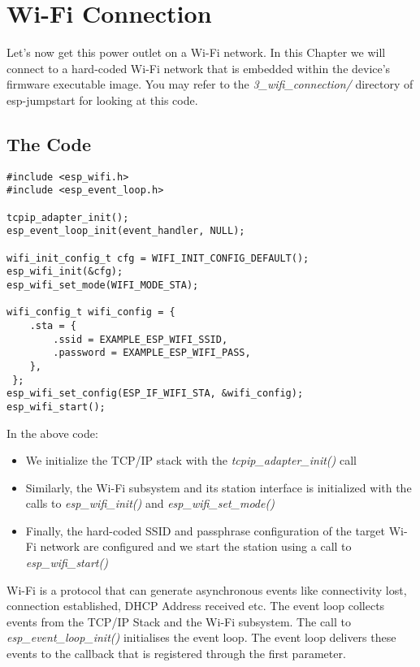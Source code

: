 \documentclass[main.tex]{subfiles}
\begin{document}
\chapter{Wi-Fi Connection}

Let's now get this power outlet on a Wi-Fi network. In this Chapter we will connect to a hard-coded Wi-Fi network that is embedded within the device's firmware executable image. You may refer to the \textit{3\_wifi\_connection/} directory of esp-jumpstart for looking at this code.

\section{The Code}
\begin{verbatim}
#include <esp_wifi.h>
#include <esp_event_loop.h>

tcpip_adapter_init();
esp_event_loop_init(event_handler, NULL);

wifi_init_config_t cfg = WIFI_INIT_CONFIG_DEFAULT();
esp_wifi_init(&cfg);
esp_wifi_set_mode(WIFI_MODE_STA);

wifi_config_t wifi_config = {
    .sta = {
        .ssid = EXAMPLE_ESP_WIFI_SSID,
        .password = EXAMPLE_ESP_WIFI_PASS,
    },
 };
esp_wifi_set_config(ESP_IF_WIFI_STA, &wifi_config);
esp_wifi_start();

\end{verbatim}

In the above code:
\begin{itemize}
    \item We initialize the TCP/IP stack with the \textit{tcpip\_adapter\_init()} call
    \item Similarly, the Wi-Fi subsystem and its station interface is initialized with the calls to \textit{esp\_wifi\_init()} and \textit{esp\_wifi\_set\_mode()}
    \item Finally, the hard-coded SSID and passphrase configuration of the target Wi-Fi network are configured and we start the station using a call to \textit{esp\_wifi\_start()}
\end{itemize}

Wi-Fi is a protocol that can generate asynchronous events like connectivity lost, connection established, DHCP Address received etc. The event loop collects events from the TCP/IP Stack and the Wi-Fi subsystem. The call to \textit{esp\_event\_loop\_init()} initialises the event loop. The event loop delivers these events to the callback that is registered through the first parameter.
\end{document}
